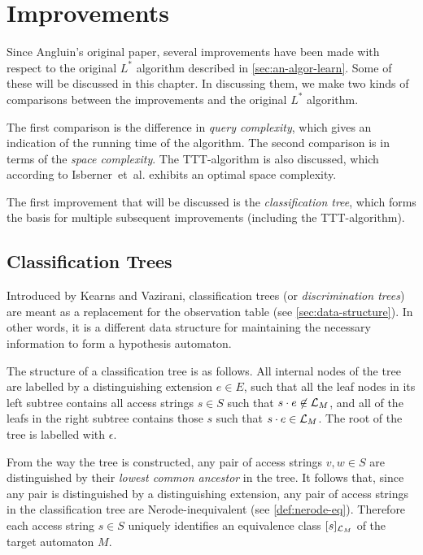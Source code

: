 \documentclass[multi,crop=false,class=article]{standalone}
\begin{document}
\section{Improvements}
\label{sec:improvements}
Since Angluin's original paper, several improvements have been made with respect
to the original $L^*$ algorithm described in \cref{sec:an-algor-learn}. Some of
these will be discussed in this chapter. In discussing them, we make two kinds
of comparisons between the improvements and the original $L^*$ algorithm.

The first comparison is the difference in \textit{query complexity}, which gives
an indication of the running time of the algorithm. The second comparison is in
terms of the \textit{space complexity}. The TTT-algorithm is also discussed,
which according to Isberner~et~al. exhibits an optimal space
complexity\cite{Isberner2014b}.

The first improvement that will be discussed is the \textit{classification
  tree}, which forms the basis for multiple subsequent improvements (including
the TTT-algorithm).

\subsection{Classification Trees}
\label{sec:classification-trees}
Introduced by Kearns and Vazirani\cite{Kearns1994}, classification trees (or
\textit{discrimination trees}) are meant as a replacement for the observation
table (see \cref{sec:data-structure}). In other words, it is a different data
structure for maintaining the necessary information to form a hypothesis
automaton.

The structure of a classification tree is as follows. All internal nodes of the
tree are labelled by a distinguishing extension $e \in E$, such that all the
leaf nodes in its left subtree contains all access strings $s \in S$ such that
$s \cdot e \not\in \mathcal{L}_M$, and all of the leafs in the right subtree
contains those $s$ such that $s \cdot e \in \mathcal{L}_M$. The root of the tree is
labelled with $\epsilon$.

From the way the tree is constructed, any pair of access strings $v,w \in S$ are
distinguished by their \textit{lowest common ancestor} in the tree. It follows
that, since any pair is distinguished by a distinguishing extension, any pair of
access strings in the classification tree are Nerode-inequivalent (see
\cref{def:nerode-eq}). Therefore each access string $s \in S$ uniquely
identifies an equivalence class $[s]_{\mathcal{L}_M}$ of the target automaton
$M$.
\end{document}
